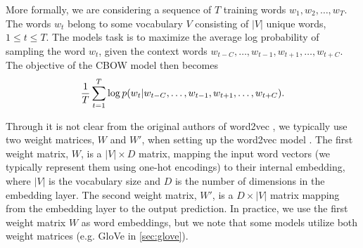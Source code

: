 More formally, we are considering a sequence of $T$ training words $w_1, w_2, \ldots, w_T$. The words $w_t$ belong to some vocabulary $V$ consisting of $|V|$ unique words, $1 \leq t \leq T$. The models task is to maximize the average log probability of sampling the word $w_t$, given the context words $w_{t-C}, \ldots, w_{t-1}, w_{t+1}, \ldots, w_{t+C}$. The objective of the CBOW model then becomes
\begin{align}
    \frac{1}{T} \sum\limits_{t=1}^{T} \log p(w_t | w_{t-C}, \ldots, w_{t-1}, w_{t+1}, \ldots, w_{t+C}).
    \label{eqn:cbow-objective-function}
\end{align}

Through it is not clear from the original authors of word2vec \cite{mikolov2013a, mikolov2013b}, we typically use two weight matrices, $W$ and $W'$, when setting up the word2vec model \cite{rong2016word2vec}. The first weight matrix, $W$, is a $|V| \times D$ matrix, mapping the input word vectors (we typically represent them using one-hot encodings) to their internal embedding, where $|V|$ is the vocabulary size and $D$ is the number of dimensions in the embedding layer. The second weight matrix, $W'$, is a $D \times |V|$ matrix mapping from the embedding layer to the output prediction. In practice, we use the first weight matrix $W$ as word embeddings, but we note that some models utilize both weight matrices (e.g. GloVe in \cref{sec:glove}).

